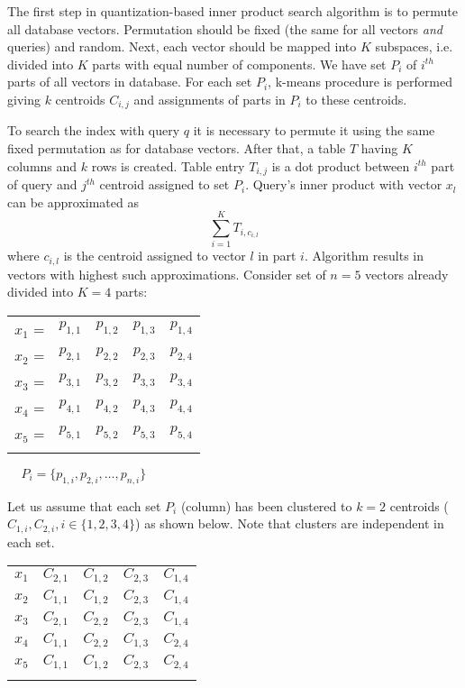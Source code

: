 The first step in quantization-based inner product search algorithm \cite{quantization} is to permute all database vectors.
Permutation should be fixed (the same for all vectors \textit{and} queries) and random.
Next, each vector should be mapped into $K$ subspaces, i.e. divided into $K$ parts with equal number of components.
We have set $P_i$ of $i^{th}$ parts of all vectors in database.
For each set $P_i$, k-means procedure is performed giving $k$ centroids $C_{i,j}$ and assignments of parts in $P_i$ to these centroids.
\par
To search the index with query $q$ it is necessary to permute it using the same fixed permutation as for database vectors.
After that, a table $T$ having $K$ columns and $k$ rows is created.
Table entry $T_{i,j}$ is a dot product between $i^{th}$ part of query and $j^{th}$ centroid assigned to set $P_i$.
Query's inner product with vector $x_l$ can be approximated as $$\sum_{i=1}^{K} T_{i,c_{i,l}}$$
where $c_{i,l}$ is the centroid assigned to vector $l$ in part $i$. Algorithm results in vectors with highest such approximations.
Consider set of $n = 5$ vectors already divided into $K = 4$ parts:
\begin{center}
\renewcommand{\arraystretch}{1.2}
\begin{tabular}{c|c|c|c|c|}
\hhline{~----}
$x_1$ = & $p_{1,1}$ & $p_{1,2}$ & $p_{1,3}$ & $p_{1,4}$ \\
\hhline{~----}
$x_2$ = & $p_{2,1}$ & $p_{2,2}$ & $p_{2,3}$ & $p_{2,4}$ \\
\hhline{~----}
$x_3$ = & $p_{3,1}$ & $p_{3,2}$ & $p_{3,3}$ & $p_{3,4}$ \\
\hhline{~----}
$x_4$ = & $p_{4,1}$ & $p_{4,2}$ & $p_{4,3}$ & $p_{4,4}$ \\
\hhline{~----}
$x_5$ = & $p_{5,1}$ & $p_{5,2}$ & $p_{5,3}$ & $p_{5,4}$ \\
\hhline{~----}
\end{tabular}
$\ \ \ \ \ P_i = \{ p_{1,i}, p_{2,i}, \ldots, p_{n,i} \}$ \\
\end{center}

\smallskip

Let us assume that each set $P_i$ (column) has been clustered to $k=2$ centroids ($C_{1,i}, C_{2,i}, i \in \{1,2,3,4\}$) as shown below. Note that clusters are independent in each set.
\begin{center}
\renewcommand{\arraystretch}{1.2}
\begin{tabular}{c|c|c|c|c|}
\hhline{~----}
$x_1$ & $C_{2,1}$ & $C_{1,2}$ & $C_{2,3}$ & $C_{1,4}$ \\
\hhline{~----}
$x_2$ & $C_{1,1}$ & $C_{1,2}$ & $C_{2,3}$ & $C_{1,4}$ \\
\hhline{~----}
$x_3$ & $C_{2,1}$ & $C_{2,2}$ & $C_{2,3}$ & $C_{1,4}$ \\
\hhline{~----}
$x_4$ & $C_{1,1}$ & $C_{2,2}$ & $C_{1,3}$ & $C_{2,4}$ \\
\hhline{~----}
$x_5$ & $C_{1,1}$ & $C_{1,2}$ & $C_{2,3}$ & $C_{2,4}$ \\
\hhline{~----}
\end{tabular}
\end{center}

